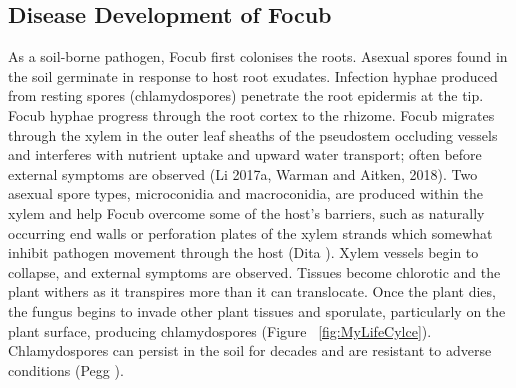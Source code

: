 \subsection{Disease Development of \acl{Focub}}

As a soil-borne pathogen, \ac{Focub} first colonises the roots. Asexual spores found in the soil germinate in response to host root exudates. Infection hyphae produced from resting spores (chlamydospores) penetrate the root epidermis at the tip. \ac{Focub} hyphae progress through the root cortex to the rhizome. \ac{Focub} migrates through the xylem in the outer leaf sheaths of the pseudostem occluding vessels and interferes with nutrient uptake and upward water transport; often before external symptoms are observed (Li \et 2017a, Warman and Aitken, 2018). Two asexual spore types, microconidia and macroconidia, are produced within the xylem and help \ac{Focub} overcome some of the host’s barriers, such as naturally occurring end walls or perforation plates of the xylem strands which somewhat inhibit pathogen movement through the host (Dita ). Xylem vessels begin to collapse, and external symptoms are observed. Tissues become chlorotic and the plant withers as it transpires more than it can translocate. Once the plant dies, the fungus begins to invade other plant tissues and sporulate, particularly on the plant surface, producing chlamydospores (Figure ~\ref{fig:MyLifeCylce}). Chlamydospores can persist in the soil for decades and are resistant to adverse conditions (Pegg ).  

